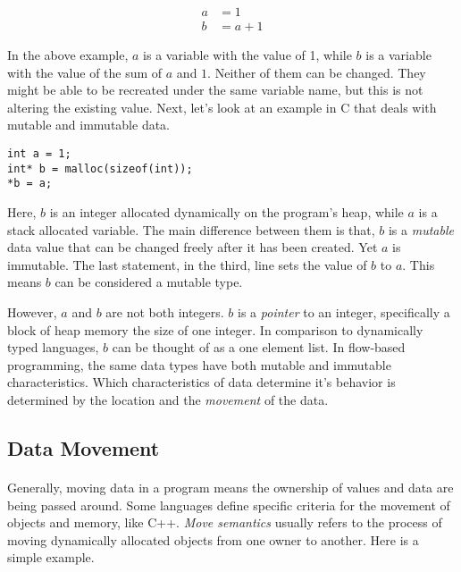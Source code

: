 \begin{align*}
a &= 1 \\
b &= a + 1
\end{align*}

\par In the above example, $a$ is a variable with the value of 1, while $b$ is a variable with the value of the sum of $a$ and $1$. Neither of them can be changed. They might be able to be recreated under the same variable name, but this is not altering the existing value. Next, let's look at an example in C that deals with mutable and immutable data.

\begin{lstlisting}[style=numc]
int a = 1;
int* b = malloc(sizeof(int));
*b = a;
\end{lstlisting}

\par Here, $b$ is an integer allocated dynamically on the program's heap, while $a$ is a stack allocated variable. The main difference between them is that, $b$ is a \emph{mutable} data value that can be changed freely after it has been created. Yet $a$ is immutable. The last statement, in the third, line sets the value of $b$ to $a$. This means $b$ can be considered a mutable type. 
\par However, $a$ and $b$ are not both integers. $b$ is a \emph{pointer} to an integer, specifically a block of heap memory the size of one integer. In comparison to dynamically typed languages, $b$ can be thought of as a one element list. In flow-based programming, the same data types have both mutable and immutable characteristics. Which characteristics of data determine it's behavior is determined by the location and the \emph{movement} of the data.

\subsection{Data Movement}

\paragraph{  }Generally, moving data in a program means the ownership of values and data are being passed around. Some languages define specific criteria for the movement of objects and memory, like C++. \emph{Move semantics} usually refers to the process of moving dynamically allocated objects from one owner to another. Here is a simple example.


